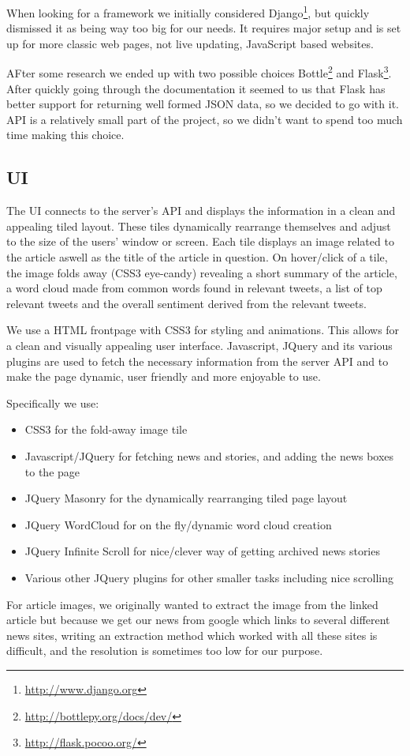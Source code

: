 \documentclass{report}
\begin{document}
		When looking for a framework we initially considered Django\footnote{\url{http://www.django.org}}, but quickly dismissed it as being way too big for our needs. It requires major setup and is set up for more classic web pages, not live updating, JavaScript based websites.
		
		AFter some research we ended up with two possible choices Bottle\footnote{\url{http://bottlepy.org/docs/dev/}} and Flask\footnote{\url{http://flask.pocoo.org/}}. After quickly going through the documentation it seemed to us that Flask has better support for returning well formed JSON data, so we decided to go with it. API is a relatively small part of the project, so we didn't want to spend too much time making this choice.
		
		\subsection{UI}
		The UI connects to the server's API and displays the information in a clean and appealing tiled layout. These tiles dynamically rearrange themselves and adjust to the size of the users' window or screen. Each tile displays an image related to the article aswell as the title of the article in question. On hover/click of a tile, the image folds away (CSS3 eye-candy) revealing a short summary of the article, a word cloud made from common words found in relevant tweets, a list of top relevant tweets and the overall sentiment derived from the relevant tweets.

    We use a HTML frontpage with CSS3 for styling and animations. This allows for a clean and visually appealing user interface. Javascript, JQuery and its various plugins are used to fetch the necessary information from the server API and to make the page dynamic, user friendly and more enjoyable to use.

Specifically we use:
  \begin{itemize}
    \item CSS3 for the fold-away image tile
    \item Javascript/JQuery for fetching news and stories, and adding the news boxes to the page
    \item JQuery Masonry for the dynamically rearranging tiled page layout
    \item JQuery WordCloud for on the fly/dynamic word cloud creation
    \item JQuery Infinite Scroll for nice/clever way of getting archived news stories
    \item Various other JQuery plugins for other smaller tasks including nice scrolling
  \end{itemize}
    For article images, we originally wanted to extract the image from the linked article but because we get our news from google which links to several different news sites, writing an extraction method which worked with all these sites is difficult, and the resolution is sometimes too low for our purpose.
    
\end{document}
